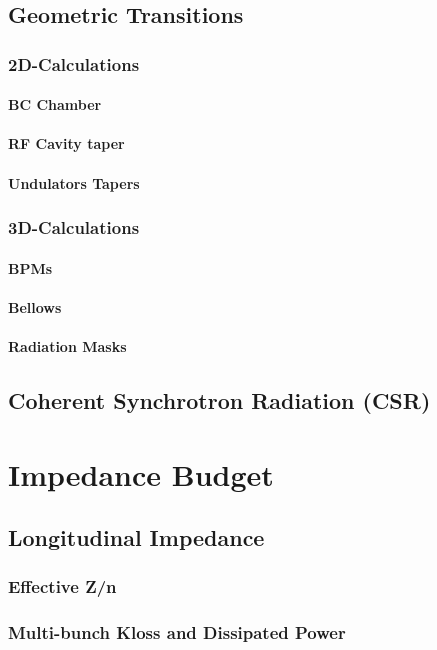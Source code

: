 \documentclass[
	12pt,				%
	openright,			%
	oneside,			%
	a4paper,		%
	chapter=TITLE,		%
	section=TITLE,		%
    brazil,				%
	english,			%
	sumario=tradicional,
	]{abntex2}
\begin{document}
    \subsection{Geometric Transitions}
      \subsubsection{2D-Calculations}
        \paragraph{BC Chamber}
        \paragraph{RF Cavity taper}
        \paragraph{Undulators Tapers}
      \subsubsection{3D-Calculations}
        \paragraph{BPMs}
        \paragraph{Bellows}
        \paragraph{Radiation Masks}
    \subsection{Coherent Synchrotron Radiation (CSR)}
  \section{Impedance Budget}
    \subsection{Longitudinal Impedance}
      \subsubsection{Effective Z/n}
      \subsubsection{Multi-bunch Kloss and Dissipated Power}
\end{document}
